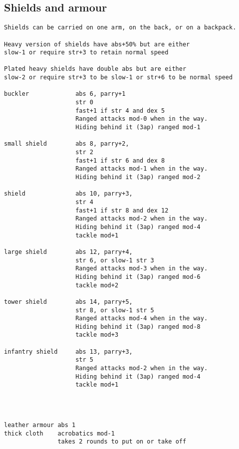 \subsection*{Shields and armour}
\small
\begin{verbatim}
Shields can be carried on one arm, on the back, or on a backpack.

Heavy version of shields have abs+50% but are either
slow-1 or require str+3 to retain normal speed

Plated heavy shields have double abs but are either
slow-2 or require str+3 to be slow-1 or str+6 to be normal speed

buckler             abs 6, parry+1
                    str 0
                    fast+1 if str 4 and dex 5
                    Ranged attacks mod-0 when in the way.
                    Hiding behind it (3ap) ranged mod-1

small shield        abs 8, parry+2,
                    str 2
                    fast+1 if str 6 and dex 8
                    Ranged attacks mod-1 when in the way.
                    Hiding behind it (3ap) ranged mod-2

shield              abs 10, parry+3,
                    str 4
                    fast+1 if str 8 and dex 12
                    Ranged attacks mod-2 when in the way.
                    Hiding behind it (3ap) ranged mod-4
                    tackle mod+1

large shield        abs 12, parry+4,
                    str 6, or slow-1 str 3
                    Ranged attacks mod-3 when in the way.
                    Hiding behind it (3ap) ranged mod-6
                    tackle mod+2

tower shield        abs 14, parry+5,
                    str 8, or slow-1 str 5
                    Ranged attacks mod-4 when in the way.
                    Hiding behind it (3ap) ranged mod-8
                    tackle mod+3

infantry shield     abs 13, parry+3,
                    str 5
                    Ranged attacks mod-2 when in the way.
                    Hiding behind it (3ap) ranged mod-4
                    tackle mod+1




\end{verbatim} \pagebreak[3] \begin{verbatim}
leather armour abs 1
thick cloth    acrobatics mod-1
               takes 2 rounds to put on or take off


\end{verbatim}
